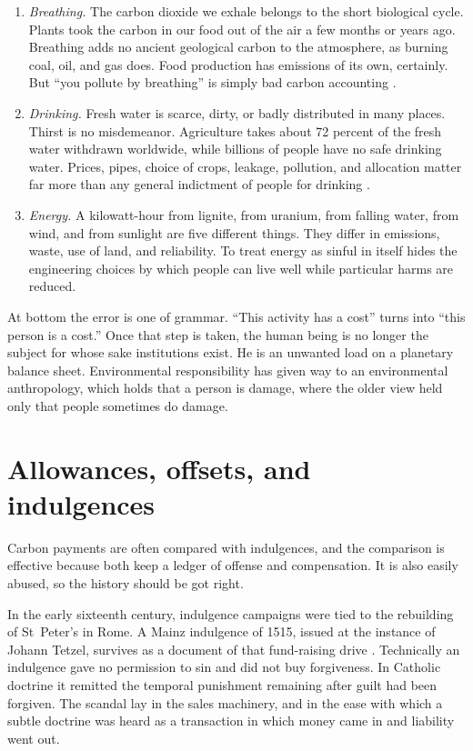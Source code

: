 \documentclass[12pt,a4paper]{book}
\begin{document}
\begin{enumerate}
\item \emph{Breathing.} The carbon dioxide we exhale belongs to the short biological cycle. Plants took the carbon in our food out of the air a few months or years ago. Breathing adds no ancient geological carbon to the atmosphere, as burning coal, oil, and gas does. Food production has emissions of its own, certainly. But ``you pollute by breathing'' is simply bad carbon accounting \cite{MITBreathingCO2}.

\item \emph{Drinking.} Fresh water is scarce, dirty, or badly distributed in many places. Thirst is no misdemeanor. Agriculture takes about 72 percent of the fresh water withdrawn worldwide, while billions of people have no safe drinking water. Prices, pipes, choice of crops, leakage, pollution, and allocation matter far more than any general indictment of people for drinking \cite{UNESCOWWDR2024}.

\item \emph{Energy.} A kilowatt-hour from lignite, from uranium, from falling water, from wind, and from sunlight are five different things. They differ in emissions, waste, use of land, and reliability. To treat energy as sinful in itself hides the engineering choices by which people can live well while particular harms are reduced.
\end{enumerate}

At bottom the error is one of grammar. ``This activity has a cost'' turns into ``this person is a cost.'' Once that step is taken, the human being is no longer the subject for whose sake institutions exist. He is an unwanted load on a planetary balance sheet. Environmental responsibility has given way to an environmental anthropology, which holds that a person is damage, where the older view held only that people sometimes do damage.

\section{Allowances, offsets, and indulgences}

Carbon payments are often compared with indulgences, and the comparison is effective because both keep a ledger of offense and compensation. It is also easily abused, so the history should be got right.

In the early sixteenth century, indulgence campaigns were tied to the rebuilding of St~Peter's in Rome. A Mainz indulgence of 1515, issued at the instance of Johann Tetzel, survives as a document of that fund-raising drive \cite{EmoryIndulgence1515}. Technically an indulgence gave no permission to sin and did not buy forgiveness. In Catholic doctrine it remitted the temporal punishment remaining after guilt had been forgiven. The scandal lay in the sales machinery, and in the ease with which a subtle doctrine was heard as a transaction in which money came in and liability went out.
\end{document}

